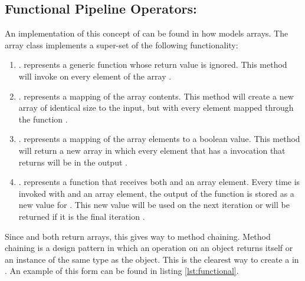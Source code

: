 \subsection{Functional Pipeline Operators: \javascript}

An implementation of this concept of \pipelines can be found in how \javascript models arrays.  The array class implements a super-set of the following functionality:

\begin{enumerate}
  \item {}.   represents a generic function whose return value is ignored.  This method will invoke  on every element of the array \cite{arrayforeach16}.

  \item {}.   represents a mapping of the array contents.  This method will create a new array of identical size to the input, but with every element mapped through the  function \cite{arraymap16}.

  \item {}.   represents a mapping of the array elements to a boolean value.  This method will return a new array in which every element that has a  invocation that returns  will be in the output \cite{arrayfilter16}.

  \item {}.   represents a function that receives both  and an array element. Every time  is invoked with  and an array element, the output of the function is stored as a new value for .  This new value will be used on the next iteration or will be returned if it is the final iteration \cite{arrayreduce16}.

\end{enumerate}

Since  and  both return arrays, this gives way to method chaining. Method chaining is a design pattern in which an operation on an object returns itself or an instance of the same type as the object. This is the clearest way to create a \pipeline in \javascript. An example of this form can be found in listing \ref{lst:functional}.

